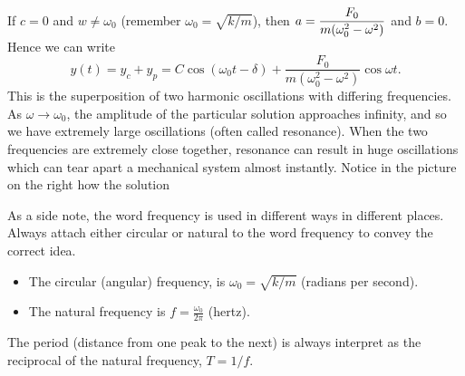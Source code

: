 \begin{observation}
If $c=0$ and $w\neq\omega_0$ (remember $\omega_0=\sqrt{k/m}$), then $\displaystyle a=\frac{F_0}{m(\omega_0^2-\omega^2)}$ and $b=0$. Hence we can write $$y(t) = y_c+y_p=C\cos(\omega_0 t-\delta)+\frac{F_0}{m(\omega_0^2-\omega^2)}\cos\omega t.$$  This is the superposition of two harmonic oscillations with differing frequencies. 
As $\omega\to\omega_0$, the amplitude of the particular solution approaches infinity, and so we have extremely large oscillations (often called resonance). When the two frequencies are extremely close together, resonance can result in huge oscillations which can tear apart a mechanical system almost instantly. Notice in the picture on the right how the solution  

As a side note, the word frequency is used in different ways in different places. Always attach either circular or natural to the word frequency to convey the correct idea.
\begin{itemize}
\item The circular (angular) frequency, is $\omega_0 = \sqrt{k/m}$ (radians per second).
\item The natural frequency is $f = \frac{\omega_0}{2\pi}$ (hertz).
\end{itemize}
The period (distance from one peak to the next) is always interpret as the reciprocal of the natural frequency, $T=1/f$.
\end{observation}

